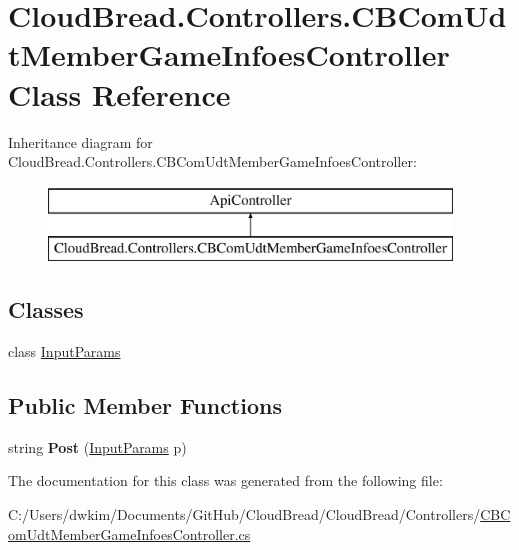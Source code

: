 \hypertarget{a00037}{}\section{Cloud\+Bread.\+Controllers.\+C\+B\+Com\+Udt\+Member\+Game\+Infoes\+Controller Class Reference}
\label{a00037}
Inheritance diagram for Cloud\+Bread.\+Controllers.\+C\+B\+Com\+Udt\+Member\+Game\+Infoes\+Controller\+:\begin{figure}[H]
\begin{center}
\leavevmode
\includegraphics[height=2.000000cm]{a00037}
\end{center}
\end{figure}
\subsection*{Classes}
\begin{DoxyCompactItemize}
\item 
class \hyperlink{a00099}{Input\+Params}
\end{DoxyCompactItemize}
\subsection*{Public Member Functions}
\begin{DoxyCompactItemize}
\item 
string {\bfseries Post} (\hyperlink{a00099}{Input\+Params} p)\hypertarget{a00037_a0de30889beff91cef76eac04ed1acf98}{}\label{a00037_a0de30889beff91cef76eac04ed1acf98}

\end{DoxyCompactItemize}


The documentation for this class was generated from the following file\+:\begin{DoxyCompactItemize}
\item 
C\+:/\+Users/dwkim/\+Documents/\+Git\+Hub/\+Cloud\+Bread/\+Cloud\+Bread/\+Controllers/\hyperlink{a00210}{C\+B\+Com\+Udt\+Member\+Game\+Infoes\+Controller.\+cs}\end{DoxyCompactItemize}
